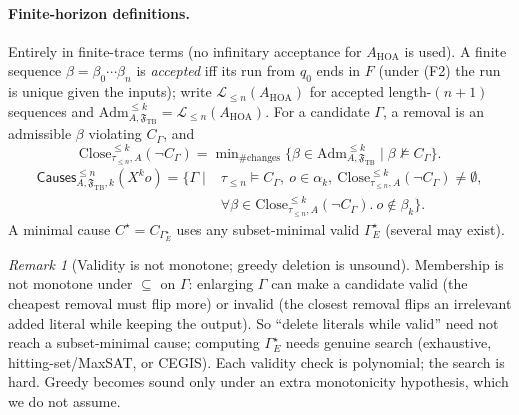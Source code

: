 \documentclass[11pt]{article}
\theoremstyle{remark}
\newtheorem{remark}{Remark}
\newcommand{\Close}{\mathrm{Close}}
\newcommand{\Lang}{\mathcal{L}}
\newcommand{\Frame}{\mathfrak{F}}
\newcommand{\Adm}{\mathrm{Adm}}
\begin{document}
\paragraph{Finite-horizon definitions.} Entirely in finite-trace terms (no
infinitary acceptance for \(A_{\mathrm{HOA}}\) is used). A finite sequence
\(\beta=\beta_0\cdots\beta_n\) is \emph{accepted} iff its run from \(q_0\) ends in
\(F\) (under (F2) the run is unique given the inputs); write
\(\Lang_{\le n}(A_{\mathrm{HOA}})\) for accepted length-\((n{+}1)\) sequences and
\(\Adm^{\le k}_{A,\Frame_{\mathrm{TB}}}=\Lang_{\le n}(A_{\mathrm{HOA}})\). For a
candidate \(\Gamma\), a removal is an admissible \(\beta\) violating \(C_\Gamma\),
and
\[
  \Close^{\le k}_{\tau_{\le n},A}(\neg C_\Gamma)=
  \min\nolimits_{\#\text{changes}}\{\beta\in\Adm^{\le k}_{A,\Frame_{\mathrm{TB}}}
  \mid\beta\not\models C_\Gamma\}.
\]
\[
\begin{aligned}
  \mathsf{Causes}^{\le n}_{A,\Frame_{\mathrm{TB}},k}(X^k o)=\{\Gamma\mid{}&
  \tau_{\le n}\models C_\Gamma,\ o\in\alpha_k,\
  \Close^{\le k}_{\tau_{\le n},A}(\neg C_\Gamma)\neq\emptyset,\\
  &\forall\beta\in\Close^{\le k}_{\tau_{\le n},A}(\neg C_\Gamma).\ o\notin\beta_k\}.
\end{aligned}
\]
A minimal cause \(C^\star=C_{\Gamma_E^\star}\) uses any subset-minimal valid
\(\Gamma_E^\star\) (several may exist).

\begin{remark}[Validity is not monotone; greedy deletion is unsound]
\label{rem:nonmonotone}
Membership is not monotone under \(\subseteq\) on \(\Gamma\): enlarging \(\Gamma\)
can make a candidate valid (the cheapest removal must flip more) or invalid (the
closest removal flips an irrelevant added literal while keeping the output). So
``delete literals while valid'' need not reach a subset-minimal cause; computing
\(\Gamma_E^\star\) needs genuine search (exhaustive, hitting-set/MaxSAT, or CEGIS).
Each validity check is polynomial; the search is hard. Greedy becomes sound only
under an extra monotonicity hypothesis, which we do not assume.
\end{remark}
\end{document}
